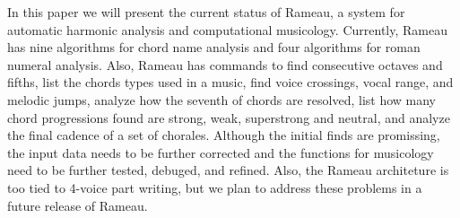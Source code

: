 In this paper we will present the current status of Rameau, a system
for automatic harmonic analysis and computational musicology.
Currently, Rameau has nine algorithms for chord name analysis and four
algorithms for roman numeral analysis. Also, Rameau has commands to
find consecutive octaves and fifths, list the chords types used in a
music, find voice crossings, vocal range, and melodic jumps, analyze
how the seventh of chords are resolved, list how many chord
progressions found are strong, weak, superstrong and neutral, and
analyze the final cadence of a set of chorales. Although the initial
finds are promissing, the input data needs to be further corrected and
the functions for musicology need to be further tested, debuged, and
refined. Also, the Rameau architeture is too tied to 4-voice part
writing, but we plan to address these problems in a future release of
Rameau.

